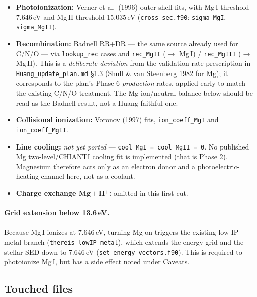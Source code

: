 \documentclass[english,a4paper]{kiseon_memo}
\begin{document}
\begin{itemize}
\item \textbf{Photoionization:} Verner et al.\ (1996) outer-shell fits, with
  Mg\,I threshold 7.646\,eV and Mg\,II threshold 15.035\,eV
  (\texttt{cross\_sec.f90}: \verb|sigma_MgI|, \verb|sigma_MgII|).
\item \textbf{Recombination:} Badnell RR+DR --- the same source already used for
  C/N/O --- via \verb|lookup_rec| cases and \verb|rec_MgII| ($\to$ Mg\,I) /
  \verb|rec_MgIII| ($\to$ Mg\,II). This is a \emph{deliberate deviation} from the
  validation-rate prescription in \texttt{Huang\_update\_plan.md} \S1.3 (Shull
  \& van Steenberg 1982 for Mg); it corresponds to the plan's Phase-6
  \emph{production} rates, applied early to match the existing C/N/O treatment.
  The Mg ion/neutral balance below should be read as the Badnell result, not a
  Huang-faithful one.
\item \textbf{Collisional ionization:} Voronov (1997) fits,
  \verb|ion_coeff_MgI| and \verb|ion_coeff_MgII|.
\item \textbf{Line cooling:} \emph{not yet ported} ---
  \verb|cool_MgI = cool_MgII = 0|. No published Mg two-level/CHIANTI cooling fit
  is implemented (that is Phase 2). Magnesium therefore acts only as an electron
  donor and a photoelectric-heating channel here, not as a coolant.
\item \textbf{Charge exchange Mg\,$+$\,H$^+$:} omitted in this first cut.
\end{itemize}

\paragraph{Grid extension below 13.6\,eV.} Because Mg\,I ionizes at 7.646\,eV,
turning Mg on triggers the existing low-IP-metal branch
(\verb|thereis_lowIP_metal|), which extends the energy grid and the stellar SED
down to 7.646\,eV (\texttt{set\_energy\_vectors.f90}). This is required to
photoionize Mg\,I, but has a side effect noted under Caveats.

\subsection{Touched files}
\end{document}
